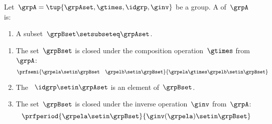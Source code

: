 \begin{definition}[Subgroup]\label{def:subgroup}
    Let~$\grpA = \tup{\grpAset, \gtimes, \idgrp, \ginv}$ be a group.
    A  of~$\grpA$ is:

    \constit

    \begin{enumerate}
        \item A subset~$\grpBset \setsubseteq \grpAset$.
    \end{enumerate}

    \condit

    \begin{enumerate}
        \item The set~$\grpBset$ is closed under the composition operation~$\gtimes$ from~$\grpA$:
              \begin{equation}
                  \prfsemi{\grpela \setin \grpBset \quad \grpelb \setin \grpBset}{\grpela \gtimes \grpelb \setin \grpBset}
              \end{equation}

        \item The ~$\idgrp \setin \grpAset$ is an element of~$\grpBset$.

        \item The set~$\grpBset$ is closed under the inverse operation~$\ginv$ from~$\grpA$:
              \begin{equation}
                  \prfperiod{\grpela \setin \grpBset}{\ginv(\grpela) \setin \grpBset}
              \end{equation}
    \end{enumerate}
\end{definition}
